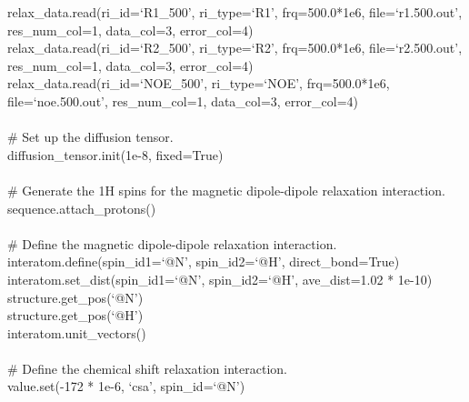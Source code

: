 \begin{htmlonly}
\begin{htmlonly}
\begin{exampleenv}
\hspace*{4ex} relax\_data.read(ri\_id=`R1\_500',  ri\_type=`R1',  frq=500.0*1e6, file=`r1.500.out', res\_num\_col=1, data\_col=3, error\_col=4) \\
\hspace*{4ex} relax\_data.read(ri\_id=`R2\_500',  ri\_type=`R2',  frq=500.0*1e6, file=`r2.500.out', res\_num\_col=1, data\_col=3, error\_col=4) \\
\hspace*{4ex} relax\_data.read(ri\_id=`NOE\_500', ri\_type=`NOE', frq=500.0*1e6, file=`noe.500.out', res\_num\_col=1, data\_col=3, error\_col=4) \\
 \\
\hspace*{4ex} \# Set up the diffusion tensor. \\
\hspace*{4ex} diffusion\_tensor.init(1e-8, fixed=True) \\
 \\
\hspace*{4ex} \# Generate the 1H spins for the magnetic dipole-dipole relaxation interaction. \\
\hspace*{4ex} sequence.attach\_protons() \\
 \\
\hspace*{4ex} \# Define the magnetic dipole-dipole relaxation interaction. \\
\hspace*{4ex} interatom.define(spin\_id1=`@N', spin\_id2=`@H', direct\_bond=True) \\
\hspace*{4ex} interatom.set\_dist(spin\_id1=`@N', spin\_id2=`@H', ave\_dist=1.02 * 1e-10) \\
\hspace*{4ex} structure.get\_pos(`@N') \\
\hspace*{4ex} structure.get\_pos(`@H') \\
\hspace*{4ex} interatom.unit\_vectors() \\
 \\
\hspace*{4ex} \# Define the chemical shift relaxation interaction. \\
\hspace*{4ex} value.set(-172 * 1e-6, `csa', spin\_id=`@N') \\
 \\

\end{exampleenv}
\end{htmlonly}
\end{htmlonly}
